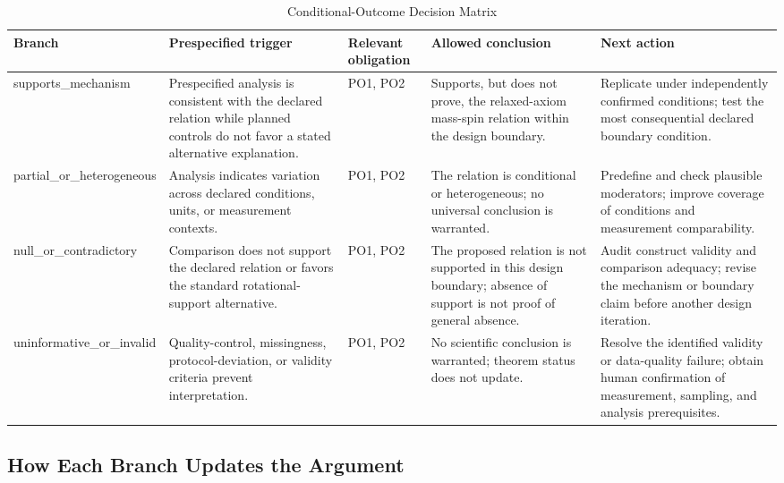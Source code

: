 \documentclass[conference]{IEEEtran}
\begin{document}
\begin{table}[htbp]
\centering
\footnotesize
\setlength{\tabcolsep}{3pt}
\renewcommand{\arraystretch}{1.12}
\caption{Conditional-Outcome Decision Matrix}
\label{tab:expected-outcomes-expected-outcomes-decision-matrix}
\begin{tabular}{|p{}|p{}|p{}|p{}|p{}|}
\hline
Branch & Prespecified trigger & Relevant obligation & Allowed conclusion & Next action \\\hline
supports\_mechanism & Prespecified analysis is consistent with the declared relation while planned controls do not favor a stated alternative explanation. & PO1, PO2 & Supports, but does not prove, the relaxed-axiom mass-spin relation within the design boundary. & Replicate under independently confirmed conditions; test the most consequential declared boundary condition. \\\hline
partial\_or\_heterogeneous & Analysis indicates variation across declared conditions, units, or measurement contexts. & PO1, PO2 & The relation is conditional or heterogeneous; no universal conclusion is warranted. & Predefine and check plausible moderators; improve coverage of conditions and measurement comparability. \\\hline
null\_or\_contradictory & Comparison does not support the declared relation or favors the standard rotational-support alternative. & PO1, PO2 & The proposed relation is not supported in this design boundary; absence of support is not proof of general absence. & Audit construct validity and comparison adequacy; revise the mechanism or boundary claim before another design iteration. \\\hline
uninformative\_or\_invalid & Quality-control, missingness, protocol-deviation, or validity criteria prevent interpretation. & PO1, PO2 & No scientific conclusion is warranted; theorem status does not update. & Resolve the identified validity or data-quality failure; obtain human confirmation of measurement, sampling, and analysis prerequisites. \\\hline
\end{tabular}
\end{table}

\subsection{How Each Branch Updates the Argument}
\end{document}
